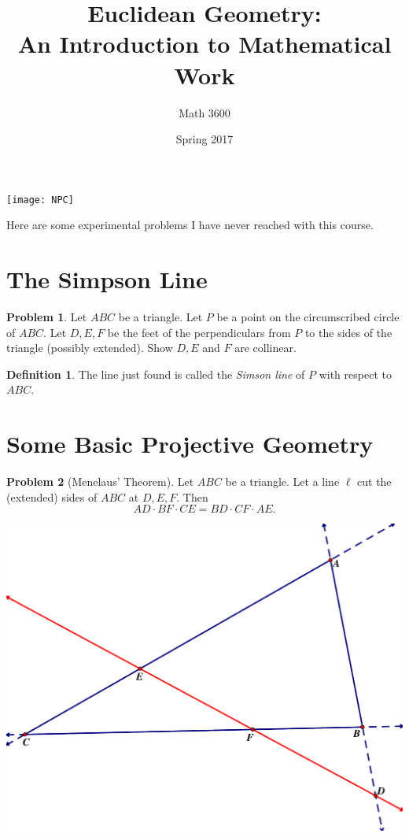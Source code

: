 \documentclass{tufte-handout}
\title{Euclidean Geometry:\\An Introduction to Mathematical Work}
\author[]{Math 3600}
\date{Spring 2017}
\theoremstyle{definition}
\newtheorem{problem}{Problem}[section]
\newtheorem*{definition}{Definition}
\begin{document}
\maketitle

\begin{marginfigure}
    \texttt{[image: NPC]}
\end{marginfigure}

\vspace{.5in}
Here are some experimental problems I have never reached with this course.

\setcounter{section}{19}
\section{The Simpson Line}

\begin{problem}\label{prob:Simson-line}
Let $ABC$ be a triangle. Let $P$ be a point on the circumscribed circle of $ABC$. Let $D, E, F$ be the feet of the perpendiculars from $P$ to the sides of the triangle (possibly extended). Show $D, E$ and $F$ are collinear.
\end{problem}

\begin{definition}\label{defn:Simson-line}
The line just found is called the \emph{Simson line} of $P$ with respect to $ABC$.
\end{definition}


\section{Some Basic Projective Geometry}

\begin{problem}[Menelaus' Theorem]\label{prob:Menelaus-theorem}
Let $ABC$ be a triangle. Let a line $\ell$ cut the (extended) sides of $ABC$ at $D, E, F$. Then
\[ AD\cdot BF \cdot CE = BD \cdot CF \cdot AE .\]
\end{problem}


\begin{center}
\includegraphics[width=.9\textwidth]{Menelaus.pdf}
\end{center}
\end{document}
